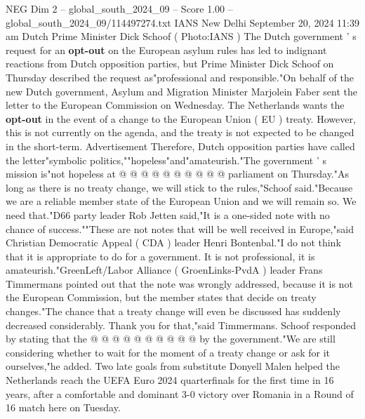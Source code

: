 \begin{textsample}{NEG Dim 2 – global\_south\_2024\_09 – Score 1.00 – global\_south\_2024\_09/114497274.txt}
IANS New Delhi September 20, 2024 11:39 am Dutch Prime Minister Dick Schoof ( Photo:IANS ) The Dutch government ' s request for an \textbf{opt-out} on the European asylum rules has led to indignant reactions from Dutch opposition parties, but Prime Minister Dick Schoof on Thursday described the request as"professional and responsible."On behalf of the new Dutch government, Asylum and Migration Minister Marjolein Faber sent the letter to the European Commission on Wednesday.
The Netherlands wants the \textbf{opt-out} in the event of a change to the European Union ( EU ) treaty.
However, this is not currently on the agenda, and the treaty is not expected to be changed in the short-term.
Advertisement Therefore, Dutch opposition parties have called the letter"symbolic politics,""hopeless"and"amateurish."The government ' s mission is"not hopeless at @ @ @ @ @ @ @ @ @ @ parliament on Thursday."As long as there is no treaty change, we will stick to the rules,"Schoof said."Because we are a reliable member state of the European Union and we will remain so.
We need that."D66 party leader Rob Jetten said,"It is a one-sided note with no chance of success.""These are not notes that will be well received in Europe,"said Christian Democratic Appeal ( CDA ) leader Henri Bontenbal."I do not think that it is appropriate to do for a government.
It is not professional, it is amateurish."GreenLeft/Labor Alliance ( GroenLinks-PvdA ) leader Frans Timmermans pointed out that the note was wrongly addressed, because it is not the European Commission, but the member states that decide on treaty changes."The chance that a treaty change will even be discussed has suddenly decreased considerably.
Thank you for that,"said Timmermans.
Schoof responded by stating that the @ @ @ @ @ @ @ @ @ @ by the government."We are still considering whether to wait for the moment of a treaty change or ask for it ourselves,"he added.
Two late goals from substitute Donyell Malen helped the Netherlands reach the UEFA Euro 2024 quarterfinals for the first time in 16 years, after a comfortable and dominant 3-0 victory over Romania in a Round of 16 match here on Tuesday.

\end{textsample}
